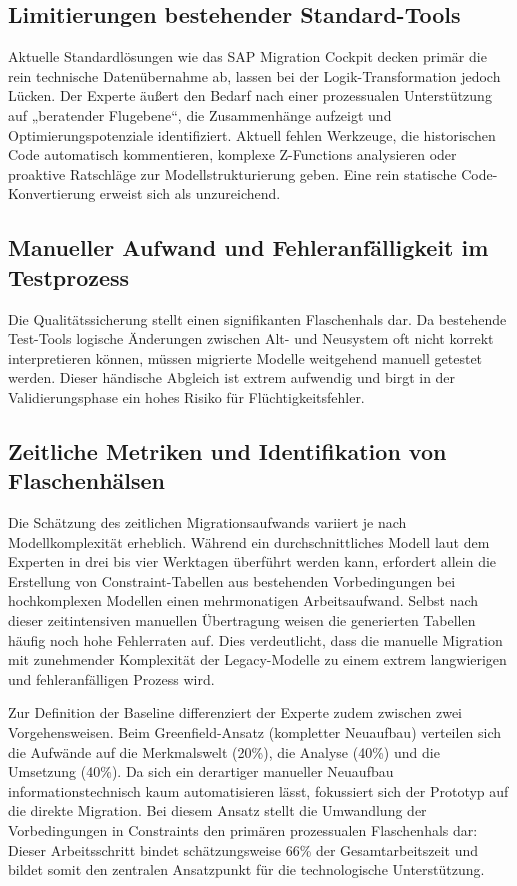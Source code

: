 \subsection{Limitierungen bestehender Standard-Tools}
Aktuelle Standardlösungen wie das SAP Migration Cockpit decken primär die rein technische Datenübernahme ab, lassen bei der Logik-Transformation jedoch Lücken. Der Experte äußert den Bedarf nach einer prozessualen Unterstützung auf „beratender Flugebene“, die Zusammenhänge aufzeigt und Optimierungspotenziale identifiziert. Aktuell fehlen Werkzeuge, die historischen Code automatisch kommentieren, komplexe Z-Functions analysieren oder proaktive Ratschläge zur Modellstrukturierung geben. Eine rein statische Code-Konvertierung erweist sich als unzureichend.

\subsection{Manueller Aufwand und Fehleranfälligkeit im Testprozess}
Die Qualitätssicherung stellt einen signifikanten Flaschenhals dar. Da bestehende Test-Tools logische Änderungen zwischen Alt- und Neusystem oft nicht korrekt interpretieren können, müssen migrierte Modelle weitgehend manuell getestet werden. Dieser händische Abgleich ist extrem aufwendig und birgt in der Validierungsphase ein hohes Risiko für Flüchtigkeitsfehler.

\subsection{Zeitliche Metriken und Identifikation von Flaschenhälsen}
Die Schätzung des zeitlichen Migrationsaufwands variiert je nach Modellkomplexität erheblich. Während ein durchschnittliches Modell laut dem Experten in drei bis vier Werktagen überführt werden kann, erfordert allein die Erstellung von Constraint-Tabellen aus bestehenden Vorbedingungen bei hochkomplexen Modellen einen mehrmonatigen Arbeitsaufwand. Selbst nach dieser zeitintensiven manuellen Übertragung weisen die generierten Tabellen häufig noch hohe Fehlerraten auf. Dies verdeutlicht, dass die manuelle Migration mit zunehmender Komplexität der Legacy-Modelle zu einem extrem langwierigen und fehleranfälligen Prozess wird.

Zur Definition der Baseline differenziert der Experte zudem zwischen zwei Vorgehensweisen. Beim Greenfield-Ansatz (kompletter Neuaufbau) verteilen sich die Aufwände auf die Merkmalswelt (20\%), die Analyse (40\%) und die Umsetzung (40\%). Da sich ein derartiger manueller Neuaufbau informationstechnisch kaum automatisieren lässt, fokussiert sich der Prototyp auf die direkte Migration. Bei diesem Ansatz stellt die Umwandlung der Vorbedingungen in Constraints den primären prozessualen Flaschenhals dar: Dieser Arbeitsschritt bindet schätzungsweise 66\% der Gesamtarbeitszeit und bildet somit den zentralen Ansatzpunkt für die technologische Unterstützung.


